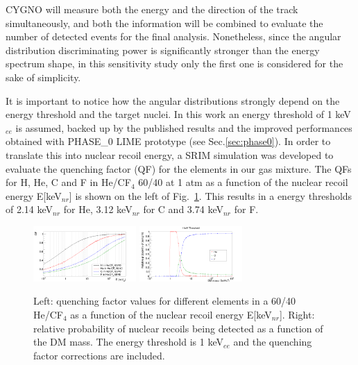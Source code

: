 \documentclass[physics,article,submit,moreauthors,pdftex]{Definitions/mdpi}
\begin{document}
CYGNO will measure both the energy and the direction of the track simultaneously, and both the information will be combined to evaluate the number of detected events for the final analysis. Nonetheless, since the angular distribution discriminating power is significantly stronger than the energy spectrum shape, in this sensitivity study only the first one is considered for the sake of simplicity. 

It is important to notice how the angular distributions strongly depend on the energy threshold and the target nuclei. In this work an energy threshold of 1 keV$_{ee}$ is assumed, backed up by the published results \cite{bib:fe55} and the improved performances obtained with PHASE\_0 LIME prototype (see Sec.\ref{sec:phase0}). In order to translate this into nuclear recoil energy, a SRIM simulation was developed to evaluate the quenching factor (QF) for the elements in our gas mixture. The QFs for H, He, C and F in He/CF$_4$ 60/40 at 1 atm as a function of the nuclear recoil energy E[keV$_{nr}$] is shown on the left of Fig.~\ref{fig:QF_Probele}. This results in a energy thresholds of 2.14 keV$_{nr}$ for He, 3.12 keV$_{nr}$ for C and 3.74 keV$_{nr}$ for F.

\begin{figure}[!t]
\centering
 \includegraphics[width=0.35\textwidth]{QF.png}
 \includegraphics[width=0.35\textwidth]{Prob_hitting.png}
 \caption{Left: quenching factor values for different elements in a 60/40 He/CF$_4$ as a function of the nuclear recoil energy E[keV$_{nr}$]. Right: relative probability of nuclear recoils being detected as a function of the DM mass. The energy threshold is 1 keV$_{ee}$ and the quenching factor corrections are included.}
 \label{fig:QF_Probele}
 \end{figure}
\end{document}
